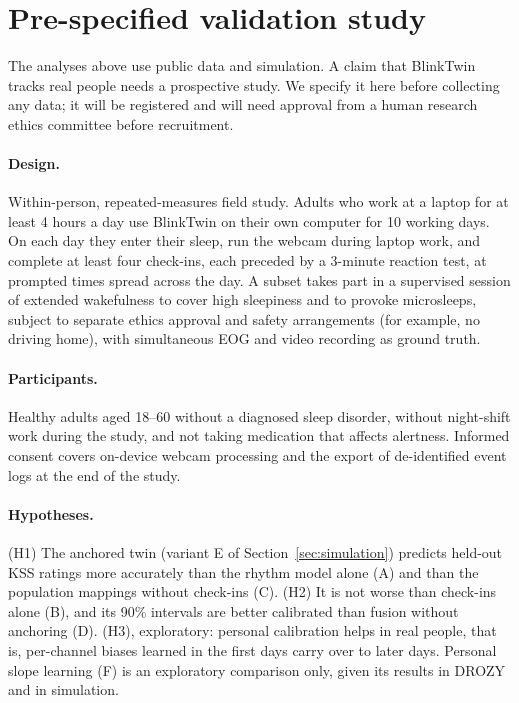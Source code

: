 \section{Pre-specified validation study}
\label{sec:protocol}

The analyses above use public data and simulation. A claim that BlinkTwin tracks real people needs a prospective study. We specify it here before collecting any data; it will be registered and will need approval from a human research ethics committee before recruitment.

\paragraph{Design.} Within-person, repeated-measures field study. Adults who work at a laptop for at least 4 hours a day use BlinkTwin on their own computer for 10 working days. On each day they enter their sleep, run the webcam during laptop work, and complete at least four check-ins, each preceded by a 3-minute reaction test, at prompted times spread across the day. A subset takes part in a supervised session of extended wakefulness to cover high sleepiness and to provoke microsleeps, subject to separate ethics approval and safety arrangements (for example, no driving home), with simultaneous EOG and video recording as ground truth.

\paragraph{Participants.} Healthy adults aged 18--60 without a diagnosed sleep disorder, without night-shift work during the study, and not taking medication that affects alertness. Informed consent covers on-device webcam processing and the export of de-identified event logs at the end of the study.

\paragraph{Hypotheses.} (H1) The anchored twin (variant E of Section~\ref{sec:simulation}) predicts held-out KSS ratings more accurately than the rhythm model alone (A) and than the population mappings without check-ins (C). (H2) It is not worse than check-ins alone (B), and its 90\% intervals are better calibrated than fusion without anchoring (D). (H3), exploratory: personal calibration helps in real people, that is, per-channel biases learned in the first days carry over to later days. Personal slope learning (F) is an exploratory comparison only, given its results in DROZY and in simulation.

